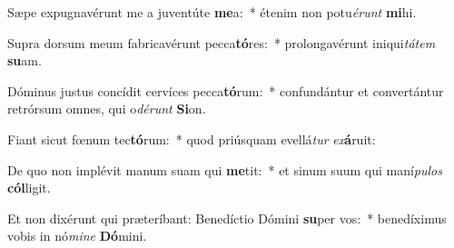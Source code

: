 \item Sæpe expugnavérunt me a juventúte \textbf{me}a:~* étenim non potu\textit{é}\textit{runt} \textbf{mi}hi.
\item Supra dorsum meum fabricavérunt pecca\textbf{tó}res:~* prolongavérunt iniqui\textit{tá}\textit{tem} \textbf{su}am.
\item Dóminus justus concídit cervíces pecca\textbf{tó}rum:~* confundántur et convertántur retrórsum omnes, qui o\textit{dé}\textit{runt} \textbf{Si}on.
\item Fiant sicut fœnum tec\textbf{tó}rum:~* quod priúsquam evellá\textit{tur} \textit{ex}\textbf{á}ruit:
\item De quo non implévit manum suam qui \textbf{me}tit:~* et sinum suum qui maní\textit{pu}\textit{los} \textbf{cól}ligit.
\item Et non dixérunt qui præteríbant: Benedíctio Dómini \textbf{su}per vos:~* benedíximus vobis in nó\textit{mi}\textit{ne} \textbf{Dó}mini.
